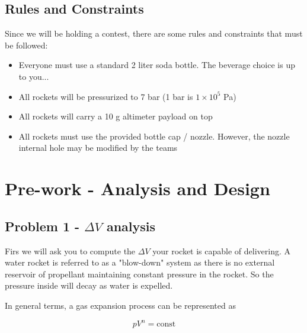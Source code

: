 \documentclass[]{memoir} %
\begin{document}
\subsection{Rules and Constraints}

Since we will be holding a contest, there are some rules and constraints that must be followed:

\begin{itemize}
    \item Everyone must use a standard 2 liter soda bottle.  The beverage choice is up to you...
    \item All rockets will be pressurized to 7 bar (1 bar is $1\times10^5$ Pa)
    \item All rockets will carry a 10 g altimeter payload on top
    \item All rockets must use the provided bottle cap / nozzle.  However, the nozzle internal
        hole may be modified by the teams
\end{itemize}

\section{Pre-work - Analysis and Design}

\subsection{Problem 1 - $\Delta V$ analysis}
Firs we will ask you to compute the $\Delta V$ your rocket is capable of delivering.  A water 
rocket is referred to as a "blow-down" system as there is no external reservoir of propellant
maintaining constant pressure in the rocket.  So the pressure inside will decay as water is
expelled. 

In general terms, a gas expansion process can be represented as

\begin{equation}
    pV^n = \text{const}
\end{equation}
\end{document}
